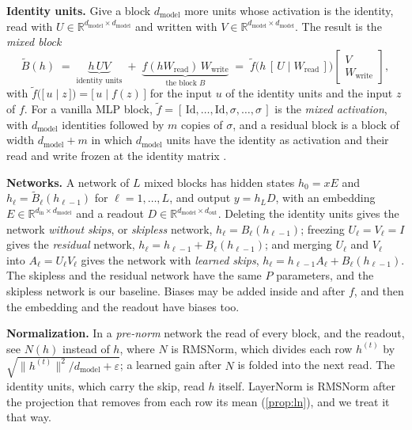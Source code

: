 \documentclass[10pt]{article}
\theoremstyle{definition}
\theoremstyle{remark}
\newcommand{\R}{\mathbb{R}}
\newcommand{\Wread}{W_{\mathrm{read}}}
\newcommand{\Wwrite}{W_{\mathrm{write}}}
\newcommand{\dm}{d_{\mathrm{model}}}
\newcommand{\norm}[1]{\lVert #1\rVert}
\newcommand{\para}[1]{\smallskip\noindent\textbf{#1}\hspace{0.5em}}
\begin{document}
\para{Identity units.} Give a block $\dm$ more units whose activation is the identity, read with $U \in \R^{\dm\times \dm}$ and written with $V \in \R^{\dm\times \dm}$. The result is the \emph{mixed block}
\begin{equation}\label{eq:mixed}
\tilde B(h) \;=\; \underbrace{h\,U V}_{\text{identity units}} \;+\; \underbrace{f(h\Wread)\,\Wwrite}_{\text{the block } B} \;=\; \tilde f\big(h\,[\,U \mid \Wread\,]\big)\begin{bmatrix} V \\ \Wwrite \end{bmatrix},
\end{equation}
with $\tilde f\big(\big[\, u \;\big|\; z \,\big]\big) = \big[\, u \;\big|\; f(z) \,\big]$ for the input $u$ of the identity units and the input $z$ of $f$. For a vanilla MLP block, $\tilde f = [\,\mathrm{Id}, \dots, \mathrm{Id}, \sigma, \dots, \sigma\,]$ is the \emph{mixed activation}, with $\dm$ identities followed by $m$ copies of $\sigma$, and a residual block is a block of width $\dm + m$ in which $\dm$ units have the identity as activation and their read and write frozen at the identity matrix \citep[Section~4]{lin2018resnet}.

\para{Networks.} A network of $L$ mixed blocks has hidden states $h_0 = xE$ and $h_\ell = \tilde B_\ell(h_{\ell-1})$ for $\ell = 1, \dots, L$, and output $y = h_LD$, with an embedding $E \in \R^{d_{\mathrm{in}}\times \dm}$ and a readout $D \in \R^{\dm\times d_{\mathrm{out}}}$. Deleting the identity units gives the network \emph{without skips}, or \emph{skipless} network, $h_\ell = B_\ell(h_{\ell-1})$; freezing $U_\ell = V_\ell = I$ gives the \emph{residual} network, $h_\ell = h_{\ell-1} + B_\ell(h_{\ell-1})$; and merging $U_\ell$ and $V_\ell$ into $A_\ell = U_\ell V_\ell$ gives the network with \emph{learned skips}, $h_\ell = h_{\ell-1}A_\ell + B_\ell(h_{\ell-1})$. The skipless and the residual network have the same $P$ parameters, and the skipless network is our baseline. Biases may be added inside and after $f$, and then the embedding and the readout have biases too.

\para{Normalization.} In a \emph{pre-norm} network the read of every block, and the readout, see $N(h)$ instead of $h$, where $N$ is RMSNorm, which divides each row $h^{(t)}$ by $\sqrt{\norm{h^{(t)}}^2/\dm + \varepsilon}$; a learned gain after $N$ is folded into the next read. The identity units, which carry the skip, read $h$ itself. LayerNorm is RMSNorm after the projection that removes from each row its mean (\cref{prop:ln}), and we treat it that way.
\end{document}
